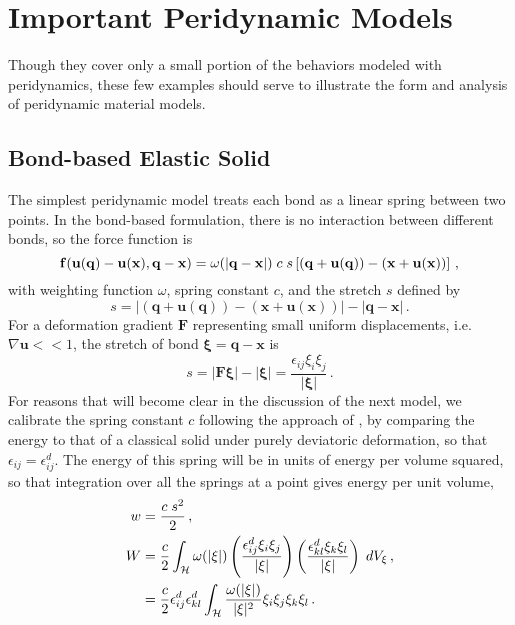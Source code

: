\section{Important Peridynamic Models}
Though they cover only a small portion of the behaviors modeled with peridynamics, these few examples should serve to illustrate the form and analysis of peridynamic material models.
\subsection{Bond-based Elastic Solid}
The simplest peridynamic model treats each bond as a linear spring between two points.
In the bond-based formulation, there is no interaction between different bonds, so the force function is
%
\begin{equation}
\mathit{\mathbf{f}}(\mathbf{u}(\mathbf{q})-\mathbf{u}(\mathbf{x}),\mathbf{q}-\mathbf{x}) = \omega(|\mathbf{q}-\mathbf{x}|)\;c\;s \left[(\mathbf{q}+\mathbf{u}(\mathbf{q}))-(\mathbf{x}+\mathbf{u}(\mathbf{x}))\right]\, ,
\end{equation}
%
with weighting function $\omega$, spring constant $c$, and the stretch $s$ defined by
%
\begin{equation}
\label{eq:stretch}
s = |(\mathbf{q}+\mathbf{u}(\mathbf{q}))-(\mathbf{x}+\mathbf{u}(\mathbf{x}))| - |\mathbf{q}-\mathbf{x}|\, .
\end{equation}
%
For a deformation gradient $\mathbf{F}$ representing small uniform displacements, i.e. $\nabla \mathbf{u} << 1$, the stretch of bond $\boldsymbol{\xi}=\mathbf{q}-\mathbf{x}$ is
%
\begin{equation*}
s = |\mathbf{F}\boldsymbol{\xi}|-|\boldsymbol{\xi}| = \frac{\epsilon_{ij}\xi_i\xi_j}{|\boldsymbol{\xi}|}\, .
\end{equation*}
%
For reasons that will become clear in the discussion of the next model, we calibrate the spring constant $c$ following the approach of \cite{silling2007peridynamic}, by comparing the energy to that of a classical solid under purely deviatoric deformation, so that $\epsilon_{ij} = \epsilon_{ij}^d$.
The energy of this spring will be in units of energy per volume squared, so that integration over all the springs at a point gives energy per unit volume,
%
\begin{align}
\label{eq:deviatoricStrainEnergy}
w &= \frac{c\;s^2}{2}\, ,\notag \\
W &= \frac{c}{2}\int_\mathcal{H} \omega(|\xi|)\left( \frac{\epsilon_{ij}^d\xi_i\xi_j}{|\xi|} \right)\left( \frac{\epsilon_{kl}^d\xi_k\xi_l}{|\xi|} \right)\;dV_\xi\, ,\notag\\
&= \frac{c}{2}\epsilon_{ij}^d \epsilon_{kl}^d \int_\mathcal{H} \frac{\omega(|\xi|)}{|\xi|^2}\xi_i\xi_j\xi_k\xi_l \, .
\end{align}
